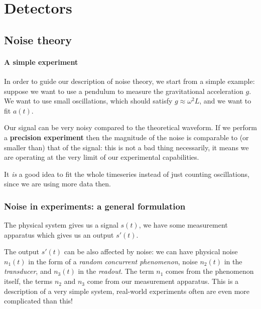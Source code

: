 \documentclass[main.tex]{subfiles}
\begin{document}
\chapter{Detectors}

\section{Noise theory}

\subsubsection{A simple experiment}


In order to guide our description of noise theory, we start from a simple example: suppose we want to use a pendulum to measure the gravitational acceleration \(g\).
We want to use small oscillations, which should satisfy \(g \approx \omega^2L\), and we want to fit \(a(t)\).

Our signal can be very noisy compared to the theoretical waveform.
If we perform a \textbf{precision experiment} then the magnitude of the noise is comparable to (or smaller than) that of the signal: this is not a bad thing necessarily, it means we are operating at the very limit of our experimental capabilities. 

It \emph{is} a good idea to fit the whole timeseries instead of just counting oscillations, since we are using more data then. 

\subsection{Noise in experiments: a general formulation}

The physical system gives us a signal \(s(t)\), we have some measurement apparatus which gives us an output \(s'(t)\).

The output \(s'(t)\) can be also affected by noise: we can have physical noise \(n_1 (t)\) in the form of a \emph{random concurrent phenomenon}, noise \(n_2 (t)\) in the \emph{transducer}, and \(n_3 (t)\) in the \emph{readout}. The term \(n_1 \) comes from the phenomenon itself, the terms \(n_2\) and \(n_3 \) come from our measurement apparatus.  
This is a description of a very simple system, real-world experiments often are even more complicated than this! 
\end{document}
